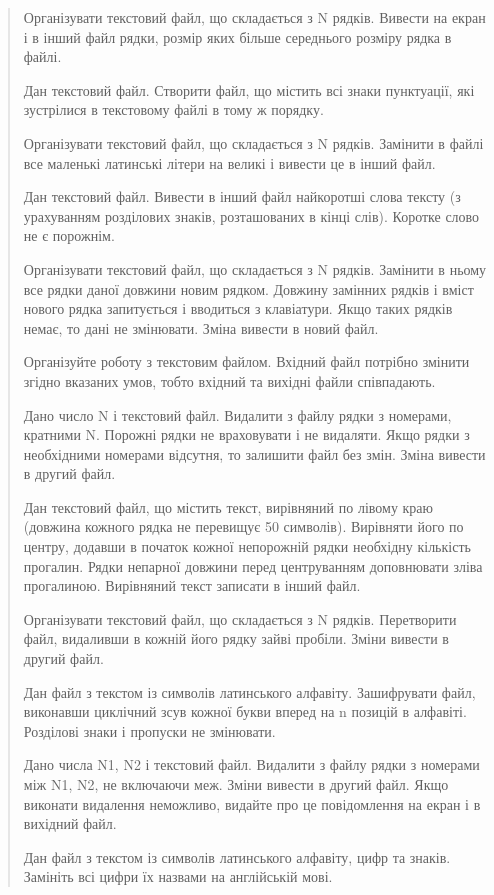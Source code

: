 \documentclass[]{article}
\begin{document}
\begin{quote}
Організувати текстовий файл, що складається з N рядків. Вивести на екран
і в інший файл рядки, розмір яких більше середнього розміру рядка в
файлі.

Дан текстовий файл. Створити файл, що містить всі знаки пунктуації, які
зустрілися в текстовому файлі в тому ж порядку.

Організувати текстовий файл, що складається з N рядків. Замінити в файлі
все маленькі латинські літери на великі і вивести це в інший файл.

Дан текстовий файл. Вивести в інший файл найкоротші слова тексту (з
урахуванням розділових знаків, розташованих в кінці слів). Коротке слово
не є порожнім.

Організувати текстовий файл, що складається з N рядків. Замінити в ньому
все рядки даної довжини новим рядком. Довжину замінних рядків і вміст
нового рядка запитується і вводиться з клавіатури. Якщо таких рядків
немає, то дані не змінювати. Зміна вивести в новий файл.

\protect\hypertarget{_Hlk65238644}{}{}Організуйте роботу з текстовим
файлом. Вхідний файл потрібно змінити згідно вказаних умов, тобто
вхідний та вихідні файли співпадають.

Дано число N і текстовий файл. Видалити з файлу рядки з номерами,
кратними N. Порожні рядки не враховувати і не видаляти. Якщо рядки з
необхідними номерами відсутня, то залишити файл без змін. Зміна вивести
в другий файл.

Дан текстовий файл, що містить текст, вирівняний по лівому краю (довжина
кожного рядка не перевищує 50 символів). Вирівняти його по центру,
додавши в початок кожної непорожній рядки необхідну кількість прогалин.
Рядки непарної довжини перед центруванням доповнювати зліва прогалиною.
Вирівняний текст записати в інший файл.

Організувати текстовий файл, що складається з N рядків. Перетворити
файл, видаливши в кожній його рядку зайві пробіли. Зміни вивести в
другий файл.

Дан файл з текстом із символів латинського алфавіту. Зашифрувати файл,
виконавши циклічний зсув кожної букви вперед на n позицій в алфавіті.
Розділові знаки і пропуски не змінювати.

Дано числа N1, N2 і текстовий файл. Видалити з файлу рядки з номерами
між N1, N2, не включаючи меж. Зміни вивести в другий файл. Якщо виконати
видалення неможливо, видайте про це повідомлення на екран і в вихідний
файл.

Дан файл з текстом із символів латинського алфавіту, цифр та знаків.
Замініть всі цифри їх назвами на англійській мові.


\end{quote}
\end{document}
